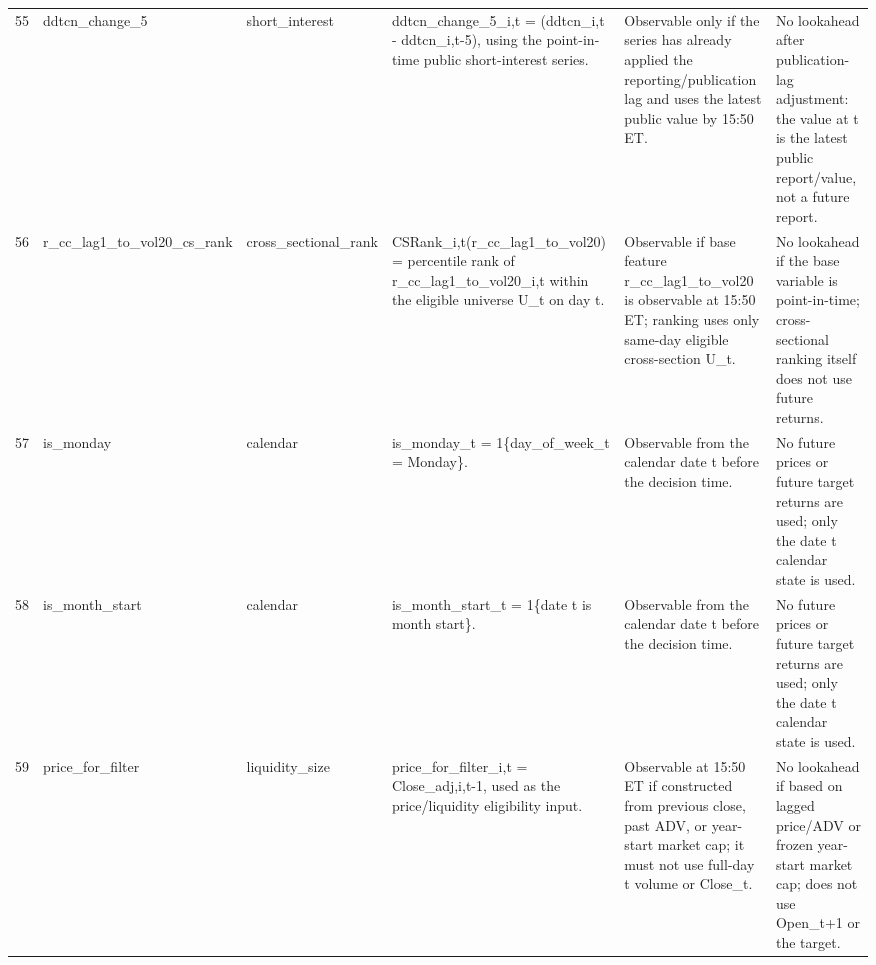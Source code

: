 \begin{landscape}
\begin{longtable}{P{0.42cm} P{2.25cm} P{2.05cm} P{5.25cm} P{4.85cm} P{5.25cm}}
55 & ddtcn\_\allowbreak{}change\_\allowbreak{}5 & short\_\allowbreak{}interest & ddtcn\_\allowbreak{}change\_\allowbreak{}5\_\allowbreak{}i,t = (ddtcn\_\allowbreak{}i,t - ddtcn\_\allowbreak{}i,t-5), using the point-in-time public short-interest series. & Observable only if the series has already applied the reporting/publication lag and uses the latest public value by 15:50 ET. & No lookahead after publication-lag adjustment: the value at t is the latest public report/value, not a future report. \\
56 & r\_\allowbreak{}cc\_\allowbreak{}lag1\_\allowbreak{}to\_\allowbreak{}vol20\_\allowbreak{}cs\_\allowbreak{}rank & cross\_\allowbreak{}sectional\_\allowbreak{}rank & CSRank\_\allowbreak{}i,t(r\_\allowbreak{}cc\_\allowbreak{}lag1\_\allowbreak{}to\_\allowbreak{}vol20) = percentile rank of r\_\allowbreak{}cc\_\allowbreak{}lag1\_\allowbreak{}to\_\allowbreak{}vol20\_\allowbreak{}i,t within the eligible universe U\_\allowbreak{}t on day t. & Observable if base feature r\_\allowbreak{}cc\_\allowbreak{}lag1\_\allowbreak{}to\_\allowbreak{}vol20 is observable at 15:50 ET; ranking uses only same-day eligible cross-section U\_\allowbreak{}t. & No lookahead if the base variable is point-in-time; cross-sectional ranking itself does not use future returns. \\
57 & is\_\allowbreak{}monday & calendar & is\_\allowbreak{}monday\_\allowbreak{}t = 1\{day\_\allowbreak{}of\_\allowbreak{}week\_\allowbreak{}t = Monday\}. & Observable from the calendar date t before the decision time. & No future prices or future target returns are used; only the date t calendar state is used. \\
58 & is\_\allowbreak{}month\_\allowbreak{}start & calendar & is\_\allowbreak{}month\_\allowbreak{}start\_\allowbreak{}t = 1\{date t is month start\}. & Observable from the calendar date t before the decision time. & No future prices or future target returns are used; only the date t calendar state is used. \\
59 & price\_\allowbreak{}for\_\allowbreak{}filter & liquidity\_\allowbreak{}size & price\_\allowbreak{}for\_\allowbreak{}filter\_\allowbreak{}i,t = Close\_\allowbreak{}adj,i,t-1, used as the price/liquidity eligibility input. & Observable at 15:50 ET if constructed from previous close, past ADV, or year-start market cap; it must not use full-day t volume or Close\_\allowbreak{}t. & No lookahead if based on lagged price/ADV or frozen year-start market cap; does not use Open\_\allowbreak{}t+1 or the target. \\

\end{longtable}
\end{landscape}
